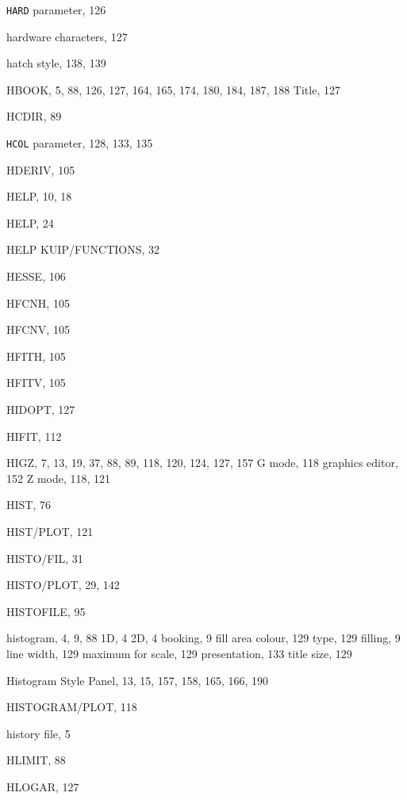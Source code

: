 \begin{theindex}
  \item {\tt HARD}
     parameter, 126
  \item hardware characters, 127
  \item hatch style, 138, 139
  \item HBOOK, 5, 88, 126, 127, 164, 165, 174, 180, 184, 187, 188
    \subitem Title, 127
  \item {\ttfamily  HCDIR}, 89
  \item {\tt HCOL}
     parameter, 128, 133, 135
  \item {\ttfamily  HDERIV}, 105
  \item HELP, 10, 18
  \item {\ttfamily  HELP}, 24
  \item {\ttfamily  HELP KUIP/FUNCTIONS}, 32
  \item {\ttfamily  HESSE}, 106
  \item {\ttfamily  HFCNH}, 105
  \item {\ttfamily  HFCNV}, 105
  \item {\ttfamily  HFITH}, 105
  \item {\ttfamily  HFITV}, 105
  \item {\ttfamily  HIDOPT}, 127
  \item {\ttfamily  HIFIT}, 112
  \item HIGZ, 7, 13, 19, 37, 88, 89, 118, 120, 124, 127, 157
    \subitem G mode, 118
    \subitem graphics editor, 152
    \subitem Z mode, 118, 121
  \item HIST, 76
  \item {\ttfamily  HIST/PLOT}, 121
  \item {\ttfamily  HISTO/FIL}, 31
  \item {\ttfamily  HISTO/PLOT}, 29, 142
  \item {\ttfamily  HISTOFILE}, 95
  \item histogram, 4, 9, 88
    \subitem 1D, 4
    \subitem 2D, 4
    \subitem booking, 9
    \subitem fill area
      \subsubitem colour, 129
      \subsubitem type, 129
    \subitem filling, 9
    \subitem line width, 129
    \subitem maximum for scale, 129
    \subitem presentation, 133
    \subitem title size, 129
  \item Histogram Style Panel, 13, 15, 157, 158, 165, 166, 190
  \item {\ttfamily  HISTOGRAM/PLOT}, 118
  \item history file, 5
  \item {\ttfamily  HLIMIT}, 88
  \item {\ttfamily  HLOGAR}, 127

\end{theindex}
